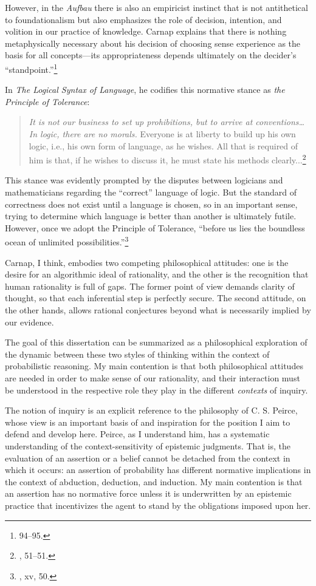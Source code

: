 However, in the \emph{Aufbau} there is also an empiricist instinct that
is not antithetical to foundationalism but also emphasizes the role of
decision, intention, and volition in our practice of knowledge. Carnap explains that there
is nothing metaphysically necessary about his decision of choosing sense experience as the basis for all concepts---its
appropriateness depends ultimately on the decider's
``standpoint.''\footnote{\cite{aufbau} 94--95.}

In \emph{The Logical Syntax of Language}, he codifies this normative
stance as \emph{the Principle of Tolerance}:

\begin{quote}
\emph{It is not our business to set up prohibitions, but to arrive at conventions\ldots{} In logic, there are no morals.} Everyone is at liberty to build up his own logic, i.e., his own form of language, as he wishes. All that is required of him is that, if he wishes to discuss it, he must state his methods clearly...\footnote{\cite{logicalsyntax}, 51--51.}
\end{quote}

This stance was evidently prompted by the disputes between logicians and
mathematicians regarding the ``correct'' language of logic. But the
standard of correctness does not exist until a language is chosen, so in
an important sense, trying to determine which language is better than
another is ultimately futile. However, once we adopt the Principle of
Tolerance, ``before us lies the boundless ocean of unlimited
possibilities.''\footnote{\cite{logicalsyntax}, xv, 50.}

Carnap, I think, embodies two competing philosophical attitudes: one is
the desire for an algorithmic ideal of rationality, and the other is the
recognition that human rationality is full of gaps. The former point of
view demands clarity of thought, so that each inferential step is
perfectly secure. The second attitude, on the other hands, allows  rational conjectures beyond what is
necessarily implied by our evidence.

The goal of this dissertation can be summarized as a philosophical
exploration of the dynamic between these two styles of thinking within
the context of probabilistic reasoning. My main contention is that both
philosophical attitudes are needed in order to make sense of our rationality, and
their interaction must be understood in the respective role they play in
the different \emph{contexts} of inquiry.

The notion of inquiry is an explicit reference to the philosophy of C.
S. Peirce, whose view is an important basis of and inspiration for the
position I aim to defend and develop here. Peirce, as I understand him,
has a systematic understanding of the context-sensitivity of epistemic
judgments. That is, the evaluation of an assertion or a belief cannot be
detached from the context in which it occurs: an assertion of
probability has different normative implications in the context of
abduction, deduction, and induction. My main contention is that an
assertion has no normative force unless it is underwritten by an
epistemic practice that incentivizes the agent to stand by the
obligations imposed upon her.


